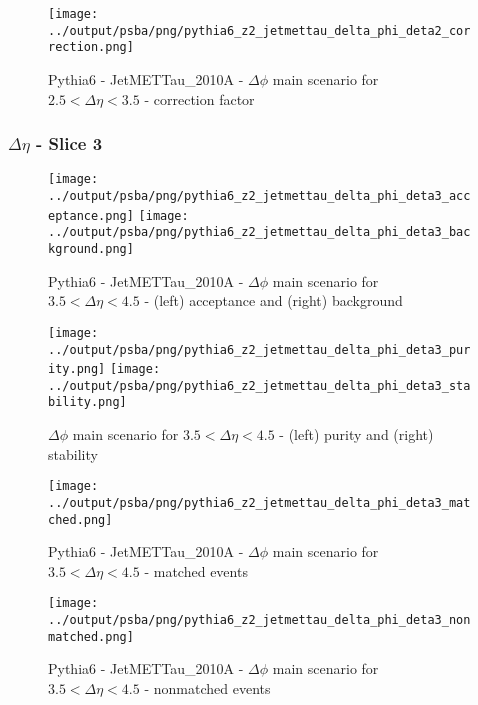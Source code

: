\documentclass[11pt]{book}
\begin{document}
\begin{figure}[ht]
\centering
\texttt{[image: ../output/psba/png/pythia6\_z2\_jetmettau\_delta\_phi\_deta2\_correction.png]}
\caption{Pythia6 - JetMETTau\_2010A - $\Delta\phi$ main scenario for $2.5 < \Delta\eta < 3.5$ - correction factor}
\label{fig:p6_jetmettau_delta_phi_deta2_correction}
\end{figure}

\clearpage
\subsubsection{$\Delta\eta$ - Slice 3}

\begin{figure}[ht]
\centering
\texttt{[image: ../output/psba/png/pythia6\_z2\_jetmettau\_delta\_phi\_deta3\_acceptance.png]}
\texttt{[image: ../output/psba/png/pythia6\_z2\_jetmettau\_delta\_phi\_deta3\_background.png]}
\caption{Pythia6 - JetMETTau\_2010A - $\Delta\phi$ main scenario for $3.5 < \Delta\eta < 4.5$ - (left) acceptance and (right) background}
\label{fig:p6_jetmettau_delta_phi_deta3_ab}
\end{figure}

\begin{figure}[ht]
\centering
\texttt{[image: ../output/psba/png/pythia6\_z2\_jetmettau\_delta\_phi\_deta3\_purity.png]}
\texttt{[image: ../output/psba/png/pythia6\_z2\_jetmettau\_delta\_phi\_deta3\_stability.png]}
\caption{$\Delta\phi$ main scenario for $3.5 < \Delta\eta < 4.5$ - (left) purity and (right) stability}
\label{fig:p6_jetmettau_delta_phi_deta3_ps}
\end{figure}

\begin{figure}[ht]
\centering
\texttt{[image: ../output/psba/png/pythia6\_z2\_jetmettau\_delta\_phi\_deta3\_matched.png]}
\caption{Pythia6 - JetMETTau\_2010A - $\Delta\phi$ main scenario for $3.5 < \Delta\eta < 4.5$ - matched events}
\label{fig:p6_jetmettau_delta_phi_deta3_matched}
\end{figure}

\begin{figure}[ht]
\centering
\texttt{[image: ../output/psba/png/pythia6\_z2\_jetmettau\_delta\_phi\_deta3\_nonmatched.png]}
\caption{Pythia6 - JetMETTau\_2010A - $\Delta\phi$ main scenario for $3.5 < \Delta\eta < 4.5$ - nonmatched events}
\label{fig:p6_jetmettau_delta_phi_deta3_nonmatched}
\end{figure}
\end{document}
